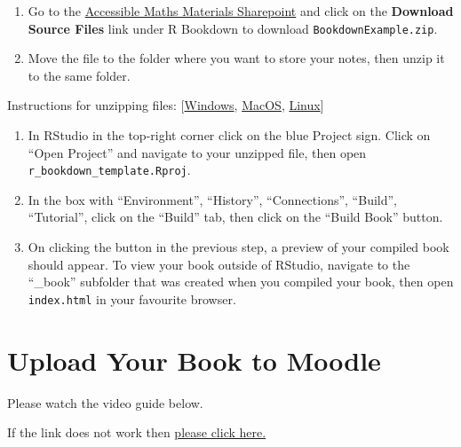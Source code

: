 \documentclass[
  letterpaper,
  oneside]{book}
\providecommand{\tightlist}{%
  \setlength{\itemsep}{0pt}\setlength{\parskip}{0pt}}\usepackage{longtable,booktabs,array}
\numberwithin{equation}{section}
\numberwithin{figure}{section}
\theoremstyle{break}
\theoremstyle{plain}
\theoremstyle{remark}
\begin{document}
\begin{enumerate}
\def\labelenumi{\arabic{enumi})}
\tightlist
\item
  Go to the
  \href{https://uniofnottm.sharepoint.com/sites/AccessibleMathsMaterials?target=_blank}{Accessible
  Maths Materials Sharepoint} and click on the \textbf{Download Source
  Files} link under R Bookdown to download \texttt{BookdownExample.zip}.
\item
  Move the file to the folder where you want to store your notes, then
  unzip it to the same folder.
\end{enumerate}

Instructions for unzipping files:
{[}\href{https://support.microsoft.com/en-us/windows/zip-and-unzip-files-f6dde0a7-0fec-8294-e1d3-703ed85e7ebc?target=_blank}{Windows},
\href{https://support.apple.com/en-gb/guide/mac-help/mchlp2528/mac\#:~:text=Unzip\%20(expand)\%20a\%20compressed\%20item,zip\%20file.?target=_blank}{MacOS},
\href{https://unstop.com/blog/how-to-unzip-a-file-in-linux?target=_blank}{Linux}{]}

\begin{enumerate}
\def\labelenumi{\arabic{enumi})}
\setcounter{enumi}{2}
\item
  In RStudio in the top-right corner click on the blue Project sign.
  Click on ``Open Project'' and navigate to your unzipped file, then
  open \texttt{r\_bookdown\_template.Rproj}.
\item
  In the box with ``Environment'', ``History'', ``Connections'',
  ``Build'', ``Tutorial'', click on the ``Build'' tab, then click on the
  ``Build Book'' button.
\item
  On clicking the button in the previous step, a preview of your
  compiled book should appear. To view your book outside of RStudio,
  navigate to the ``\_book'' subfolder that was created when you
  compiled your book, then open \texttt{index.html} in your favourite
  browser.
\end{enumerate}

\section{Upload Your Book to Moodle}\label{upload-your-book-to-moodle}

Please watch the video guide below.

If the link does not work then
\href{https://mediaspace.nottingham.ac.uk/media/How+to+upload+R+bookdown+file+to+Moodle/1_la5eitil}{please
click here.}
\end{document}
